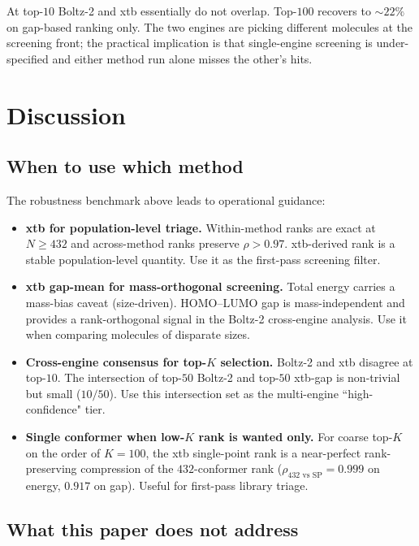 \documentclass[11pt,a4paper]{article}
\begin{document}
At top-$10$ Boltz-2 and xtb essentially do not overlap. Top-$100$
recovers to $\sim 22\%$ on gap-based ranking only. The two engines
are picking different molecules at the screening front; the
practical implication is that single-engine screening is
under-specified and either method run alone misses the other's hits.

\section{Discussion}
\label{sec:discussion}

\subsection{When to use which method}

The robustness benchmark above leads to operational guidance:

\begin{itemize}[leftmargin=*]
  \item \textbf{xtb for population-level triage.} Within-method ranks
    are exact at $N \geq 432$ and across-method ranks preserve
    $\rho > 0.97$. xtb-derived rank is a stable population-level
    quantity. Use it as the first-pass screening filter.
  \item \textbf{xtb gap-mean for mass-orthogonal screening.} Total
    energy carries a mass-bias caveat (size-driven). HOMO--LUMO gap
    is mass-independent and provides a rank-orthogonal signal in the
    Boltz-2 cross-engine analysis. Use it when comparing molecules
    of disparate sizes.
  \item \textbf{Cross-engine consensus for top-$K$ selection.}
    Boltz-2 and xtb disagree at top-$10$. The intersection of
    top-$50$ Boltz-2 and top-$50$ xtb-gap is non-trivial but small
    ($10/50$). Use this intersection set as the multi-engine
    ``high-confidence" tier.
  \item \textbf{Single conformer when low-$K$ rank is wanted only.}
    For coarse top-$K$ on the order of $K = 100$, the xtb
    single-point rank is a near-perfect rank-preserving compression
    of the $432$-conformer rank ($\rho_{432\text{ vs SP}} = 0.999$
    on energy, $0.917$ on gap). Useful for first-pass library
    triage.
\end{itemize}

\subsection{What this paper does not address}
\end{document}
